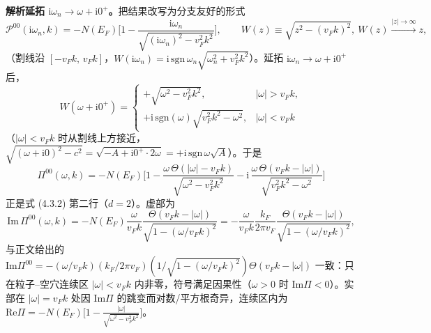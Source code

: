 \textbf{解析延拓 $\mathrm{i}\omega_n\to\omega+\mathrm{i}0^+$。}把结果改写为分支友好的形式
\begin{equation*}
\mathcal{P}^{00}(\mathrm{i}\omega_n,k)
=-N(E_F)\Big[1-\frac{\mathrm{i}\omega_n}{\sqrt{(\mathrm{i}\omega_n)^2-v_F^2k^2}}\Big],
\qquad
W(z)\equiv\sqrt{z^2-(v_Fk)^2},\ W(z)\xrightarrow{|z|\to\infty}z ,
\end{equation*}
（割线沿 $[-v_Fk,\,v_Fk]$，$W(\mathrm{i}\omega_n)=\mathrm{i}\,\mathrm{sgn}\,\omega_n\sqrt{\omega_n^2+v_F^2k^2}$）。延拓 $\mathrm{i}\omega_n\to\omega+\mathrm{i}0^+$ 后，
\begin{equation*}
W(\omega+\mathrm{i}0^+)=
\begin{cases}
+\sqrt{\omega^2-v_F^2k^2}, & |\omega|>v_Fk,\\[1ex]
+\mathrm{i}\,\mathrm{sgn}(\omega)\sqrt{v_F^2k^2-\omega^2}, & |\omega|<v_Fk
\end{cases}
\end{equation*}
（$|\omega|<v_Fk$ 时从割线上方接近，$\sqrt{(\omega+\mathrm{i}0)^2-c^2}=\sqrt{-A+\mathrm{i}0^+\cdot2\omega}=+\mathrm{i}\,\mathrm{sgn}\,\omega\sqrt{A}$）。于是
\begin{equation*}
\boxed{\;\Pi^{00}(\omega,k)=-N(E_F)\Big[1-\frac{\omega\,\Theta(|\omega|-v_Fk)}{\sqrt{\omega^2-v_F^2k^2}}
-\mathrm{i}\,\frac{\omega\,\Theta(v_Fk-|\omega|)}{\sqrt{v_F^2k^2-\omega^2}}\Big]\;}
\end{equation*}
正是式 (4.3.2) 第二行（$d=2$）。虚部为
\begin{equation*}
\mathrm{Im}\,\Pi^{00}(\omega,k)=-N(E_F)\frac{\omega}{v_Fk}\frac{\Theta(v_Fk-|\omega|)}{\sqrt{1-(\omega/v_Fk)^2}}
=-\frac{\omega}{v_Fk}\frac{k_F}{2\pi v_F}\frac{\Theta(v_Fk-|\omega|)}{\sqrt{1-(\omega/v_Fk)^2}},
\end{equation*}
与正文给出的 $\mathrm{Im}\Pi^{00}=-(\omega/v_Fk)(k_F/2\pi v_F)(1/\sqrt{1-(\omega/v_Fk)^2})\Theta(v_Fk-|\omega|)$ 一致：只在粒子--空穴连续区 $|\omega|<v_Fk$ 内非零，符号满足因果性（$\omega>0$ 时 $\mathrm{Im}\Pi<0$）。实部在 $|\omega|=v_Fk$ 处因 $\mathrm{Im}\Pi$ 的跳变而对数/平方根奇异，连续区内为 $\mathrm{Re}\Pi=-N(E_F)\big[1-\frac{|\omega|}{\sqrt{\omega^2-v_F^2k^2}}\big]$。

